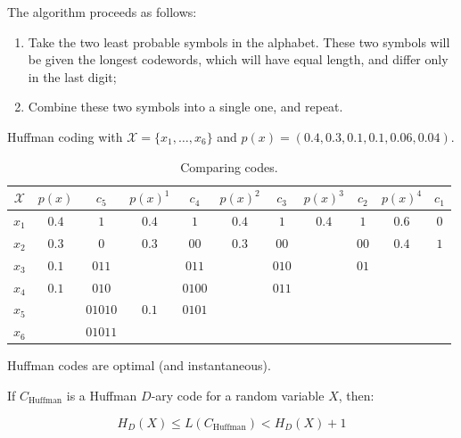 The algorithm proceeds as follows:

\begin{enumerate}
    \item Take the two least probable symbols in the alphabet. These two symbols will be given the longest codewords, which will have equal length, and differ only in the last digit;
    \item Combine these two symbols into a single one, and repeat.
\end{enumerate}

\begin{exmp} Huffman coding with $\mathcal{X} = \{x_1, \dots, x_6\}$ and $p(x) = (0.4,0.3,0.1,0.1,0.06,0.04)$.
	
	\begin{table}[H]
		\centering
		\begin{tabular}{| c | c | c | c | c | c | c | c | c | c | c |}
			\hline
			$\mathcal{X}$ & $p(x)$ & $c_5$ & $p(x)^1$ & $c_4$ & $p(x)^2$ & $c_3$ & $p(x)^3$& $c_2$ & $p(x)^4$&$c_1$ \\\hline
			$x_1$ & $0.4$ & $1$ & $0.4$ & $1$ & $0.4$ & $1$ & $0.4$& $1$ & $0.6$& $0$ \\
			$x_2$ & $0.3$ & $0$ & $0.3$ & $00$ & $0.3$ & $00$ & {\color{red}{*$0.3$}}& $00$ & $0.4$& $1$ \\
			$x_3$ & $0.1$ & $011$ & {\color{red}{*$0.1$}} & $011$ & {\color{red}{*$0.2$}} & $010$ & {\color{red}{*$0.3$}}& $01$ & &  \\
			$x_4$ & $0.1$ & $010$ & {\color{red}{*$0.1$}} & $0100$ & {\color{red}{*$0.1$}} & $011$ & & & & \\
			$x_5$ & {\color{red}{*$0.06$}} & $01010$ & $0.1$ & $0101$ & & & & & &\\
			$x_6$ & {\color{red}{*$0.04$}} & $01011$ &  &  &  & & & & & \\
			\hline
		\end{tabular}
		\caption{Comparing codes.}
	\end{table}
\end{exmp}

\begin{thm}
    Huffman codes are optimal (and instantaneous).
\end{thm}

\begin{thm}
    If $C_{\text{Huffman}}$ is a Huffman $D$-ary code for a random variable $X$, then:

    $$
    H_D(X) \leq L(C_{\text{Huffman}}) < H_D(X) + 1
    $$
\end{thm}

